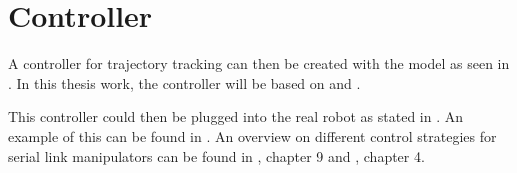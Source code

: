 \section{Controller}

A controller for trajectory tracking can then be created with the model as seen in %
\cite{evalNonlinFeedForBackControl}. In this thesis work, the controller will be based on \cite{CorkeRoboticVisionControl} and \cite{MathIntroRobManip}.

This controller could then be plugged into the real robot as stated in %
\cite{FANUCcontrolMatlab}. An example of this can be found in %
\cite{RobotModelAnalContrexampleJamshed}.
An overview on different control strategies for serial link manipulators can be found in \cite{CorkeRoboticVisionControl}, chapter 9 and \cite{MathIntroRobManip}, chapter 4.
\bigskip


























